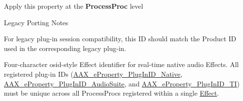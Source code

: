 \begin{Desc}
\begin{description}
\begin{DoxyItemize}
\item Apply this property at the {\bfseries Process\+Proc} level\end{DoxyItemize}
\begin{DoxyRefDesc}{Legacy Porting Notes}
\item[\hyperlink{a00384__porting_notes000042}{Legacy Porting Notes}]For legacy plug-\/in session compatibility, this I\+D should match the Product I\+D used in the corresponding legacy plug-\/in. \end{DoxyRefDesc}
\item[{\em 
\hypertarget{a00283_a6571f4e41a5dd06e4067249228e2249ea89ca3dd6e96895cda14976c1b1ceb826}{}A\+A\+X\+\_\+e\+Property\+\_\+\+Plug\+In\+I\+D\+\_\+\+Native\label{a00283_a6571f4e41a5dd06e4067249228e2249ea89ca3dd6e96895cda14976c1b1ceb826}
}]Four-\/character osid-\/style Effect identifier for real-\/time native audio Effects. All registered plug-\/in I\+Ds (\hyperlink{a00283_a6571f4e41a5dd06e4067249228e2249ea89ca3dd6e96895cda14976c1b1ceb826}{A\+A\+X\+\_\+e\+Property\+\_\+\+Plug\+In\+I\+D\+\_\+\+Native}, \hyperlink{a00283_a6571f4e41a5dd06e4067249228e2249ead3344696b8298a8b254add3d039ea927}{A\+A\+X\+\_\+e\+Property\+\_\+\+Plug\+In\+I\+D\+\_\+\+Audio\+Suite}, and \hyperlink{a00283_a6571f4e41a5dd06e4067249228e2249ea75f174df4efbeca86eaada126c1d9214}{A\+A\+X\+\_\+e\+Property\+\_\+\+Plug\+In\+I\+D\+\_\+\+T\+I}) must be unique across all Process\+Procs registered within a single \hyperlink{a00096}{Effect}.


\end{description}
\end{Desc}
